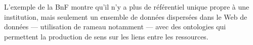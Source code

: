 L'exemple de la BnF montre qu'il n'y a plus de référentiel unique propre à une institution, mais seulement un ensemble de données dispersées dans le Web de données --- utilisation de \ac{rameau} notamment --- avec des ontologies qui permettent la production de sens sur les liens entre les ressources.